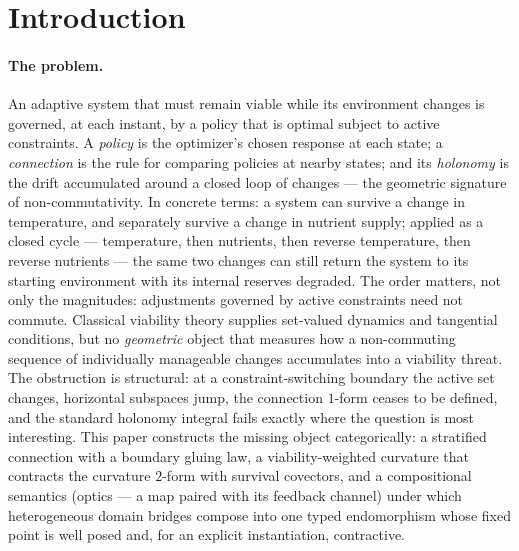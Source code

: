 \documentclass[11pt,a4paper]{article}
\theoremstyle{plain}
\theoremstyle{definition}
\theoremstyle{remark}
\begin{document}
\tableofcontents
\newpage

\section{Introduction}\label{sec:role}

\paragraph{The problem.}
An adaptive system that must remain viable while its environment
changes is governed, at each instant, by a policy that is optimal
subject to active constraints. A \emph{policy} is the optimizer's
chosen response at each state; a \emph{connection} is the rule for
comparing policies at nearby states; and its \emph{holonomy} is the
drift accumulated around a closed loop of changes --- the geometric
signature of non-commutativity. In concrete terms: a system can
survive a change in temperature, and separately survive a change in
nutrient supply; applied as a closed cycle --- temperature, then
nutrients, then reverse temperature, then reverse nutrients --- the
same two changes can still return the system to its starting
environment with its internal reserves degraded. The order matters,
not only the magnitudes: adjustments governed by active constraints
need not commute. Classical viability theory \citep{aubin2011} supplies
set-valued dynamics and tangential conditions, but no
\emph{geometric} object that measures how a non-commuting sequence
of individually manageable changes accumulates into a viability
threat. The obstruction is structural: at a constraint-switching
boundary the active set changes, horizontal subspaces jump, the
connection $1$-form ceases to be defined, and the standard holonomy
integral fails exactly where the question is most interesting. This
paper constructs the missing object categorically: a stratified
connection with a boundary gluing law, a viability-weighted
curvature that contracts the curvature $2$-form with survival
covectors, and a compositional semantics (optics --- a map paired
with its feedback channel) under which
heterogeneous domain bridges compose into one typed endomorphism
whose fixed point is well posed and, for an explicit
instantiation, contractive.
\end{document}

